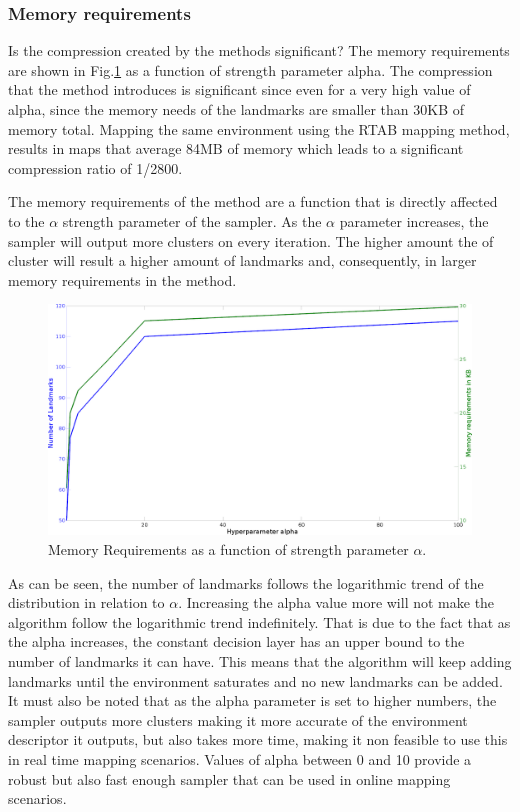 \documentclass[twoside,hidelinks]{article}
\begin{document}
\subsubsection{Memory requirements}

Is the compression created by the methods significant?
The memory requirements are shown in Fig.\ref{memReq} as a function of strength parameter alpha. The compression that the method introduces is significant since even for a very high value of alpha, since the memory needs of the landmarks are smaller than 30KB of memory total. Mapping the same environment using the RTAB mapping method, results in maps that average 84MB of memory which leads to a significant compression ratio of 1/2800.

The memory requirements of the method are a function that is directly affected to the $\alpha$ strength parameter of the sampler. As the $\alpha$ parameter increases, the sampler will output more clusters on every iteration. The higher amount the of cluster will result a higher amount of landmarks and, consequently, in larger memory requirements in the method. 

\begin{figure}[ht!]
  \centering
    \includegraphics[width=.8\textwidth]{memoryRequirements2}
    \caption{Memory Requirements as a function of strength parameter $\alpha$.}
  \label{memReq}
\end{figure}

As can be seen, the number of landmarks follows the logarithmic trend of the distribution in relation to $\alpha$. Increasing the alpha value more will not make the algorithm follow the logarithmic trend indefinitely. That is due to the fact that as the alpha increases, the constant decision layer has an upper bound to the number of landmarks it can have. This means that the algorithm will keep adding landmarks until the environment saturates and no new landmarks can be added. It must also be noted that as the alpha parameter is set to higher numbers, the sampler outputs more clusters making it more accurate of the environment descriptor it outputs, but also takes more time, making it non feasible to use this in real time mapping scenarios. Values of alpha between 0 and 10 provide a robust but also fast enough sampler that can be used in online mapping scenarios.
\end{document}

